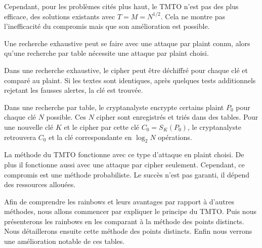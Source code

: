 		\bigskip

		Cependant, pour les problèmes cités plus haut, le \gls{TMTO} n'est pas des plus efficace, des solutions existants avec $T = M = N^{1/2}$. Cela ne montre pas l'inefficacité du compromis mais que son amélioration est possible.

		\bigskip

		Une recherche exhaustive peut se faire avec une attaque par \gls{plaint} connu, alors qu'une recherche par table nécessite une attaque par \gls{plaint} choisi.

		\bigskip

		Dans une recherche exhaustive, le \gls{cipher} peut être déchiffré pour chaque clé et comparé au \gls{plaint}. Si les textes sont identiques, après quelques tests additionnels rejetant les fausses alertes, la clé est trouvée.

		\bigskip

		Dans une recherche par table, le cryptanalyste encrypte certains \gls{plaint} $P_0$ pour chaque clé $N$ possible. Ces $N$ \gls{cipher} sont enregistrés et triés dans des tables. Pour une nouvelle clé $K$ et le \gls{cipher} par cette clé $C_0 = S_K(P_0)$, le cryptanalyste retrouvera $C_0$ et la clé correspondante en $\log_2 N$ opérations.

		\bigskip

		La méthode du \gls{TMTO} fonctionne avec ce type d'attaque en \gls{plaint} choisi. De plus il fonctionne aussi avec une attaque par \gls{cipher} seulement. Cependant, ce compromis est une méthode probabiliste. Le succès n'est pas garanti, il dépend des ressources allouées.

		\bigskip

		Afin de comprendre les \glspl{rainbow} et leurs avantages par rapport à d'autres méthodes, nous allons commencer par expliquer le principe du \gls{TMTO}. Puis nous présenterons les \glspl{rainbow} en les comparant à la méthode des points distincts. Nous détaillerons ensuite cette méthode des points distincts. Enfin nous verrons une amélioration notable de ces tables.

\endinput{}
